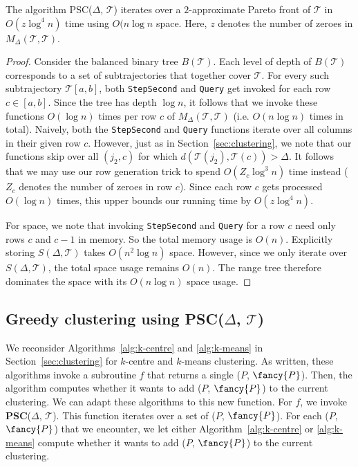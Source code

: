 \documentclass[english, thm-restate]{lipics-v2021}
\begin{document}
\begin{theorem}
The algorithm PSC($\Delta$, $\mathcal{T}$) iterates over a $2$-approximate Pareto front of $\mathcal{T}$ in $O(z \log^4 n)$ time using $O(n \log n$ space. Here, $z$ denotes the number of zeroes in $M_\Delta(\mathcal{T}, \mathcal{T})$. 
\end{theorem}

\begin{proof}
Consider the balanced binary tree $B(\mathcal{T})$.
Each level of depth of $B(\mathcal{T})$  corresponds to a set of subtrajectories that together cover $\mathcal{T}$. 
For every such subtrajectory $\mathcal{T}[a, b]$, both \texttt{StepSecond} and \texttt{Query} get invoked for each row $c \in [a, b]$. Since the tree has depth $\log n$, it follows that we invoke these functions $O(\log n)$ times per row $c$ of ${M}_\Delta(\mathcal{T}, \mathcal{T})$ (i.e. $O(n \log n)$ times in total). 
Naively, both the \texttt{StepSecond} and \texttt{Query} functions iterate over all columns in their given row $c$. 
However, just as in Section~\ref{sec:clustering}, we note that our functions skip over all $(j_2, c)$ for which $d(\mathcal{T}(j_2), \mathcal{T}(c)) > \Delta$. 
It follows that we may use our row generation trick to spend $O(Z_c \log^3 n)$ time instead ($Z_c$ denotes {the number of} zeroes in row $c$). 
Since each row $c$ gets processed $O(\log n)$ times, this upper bounds our running time by $O(z \log^4 n)$. 

For space, we note that invoking \texttt{StepSecond} and \texttt{Query} for a row $c$ need only rows $c$ and $c-1$ in memory. So the total memory usage is $O(n)$. 
Explicitly storing $S(\Delta, \mathcal{T})$ takes $O(n^2 \log n)$ space.
However, since we only iterate over $S(\Delta, \mathcal{T})$, the total space usage remains $O(n)$. 
The range tree therefore dominates the space with its $O(n \log n)$ space usage.
\end{proof}


\subsection{\texorpdfstring{Greedy clustering using \textbf{PSC($\Delta$, $\mathcal{T}$)}}{Greedy clustering using PSC(D, T)}}

We reconsider Algorithms~\ref{alg:k-centre} and \ref{alg:k-means} in Section~\ref{sec:clustering} for $k$-centre and $k$-means clustering. 
As written, these algorithms invoke a subroutine $f$ that returns a single \pathlet ($P$, ${\fancy{P}}$).
Then, the algorithm computes whether it wants to add ($P$, ${\fancy{P}}$) to the current clustering.
We can adapt these algorithms to this new function.
For $f$, we invoke \textbf{PSC}($\Delta$, $\mathcal{T}$). 
This function iterates over a set of \pathlets  ($P$, ${\fancy{P}}$).
For each \pathlet ($P$, ${\fancy{P}}$) that we encounter, we let either Algorithm~\ref{alg:k-centre} or \ref{alg:k-means} compute whether it wants to add ($P$, ${\fancy{P}}$) to the current clustering.
\end{document}
